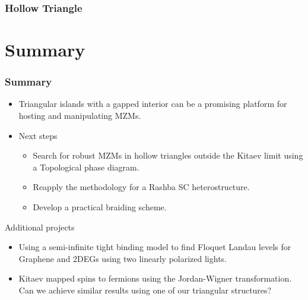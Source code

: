 \documentclass[xcolor=dvipsnames,10pt,aspectratio=169]{beamer}
\newcommand{\CO}{Summary}
\begin{document}
  \begin{frame}
    \frametitle{Hollow Triangle}

    \begin{figure}
    \end{figure}
  \end{frame}

  \section{\CO}
  \begin{frame}
    \frametitle{\CO}

    \begin{itemize}
      \item Triangular islands with a gapped interior can be a promising platform for hosting and manipulating MZMs.
      \item Next steps
      \begin{itemize}
        \item Search for robust MZMs in hollow triangles outside the Kitaev limit using a Topological phase diagram.
        \item Reapply the methodology for a Rashba SC heterostructure.
        \item Develop a practical braiding scheme.
      \end{itemize}
    \end{itemize}
    \centering
  \end{frame}

  \begin{frame}{Additional projects}

    \begin{itemize}
      \item Using a semi-infinite tight binding model to find Floquet Landau levels for Graphene and 2DEGs using two linearly polarized lights.
      \item Kitaev mapped spins to fermions using the Jordan-Wigner transformation. Can we achieve similar results using one of our triangular structures?
    \end{itemize}
  \end{frame}
\end{document}

